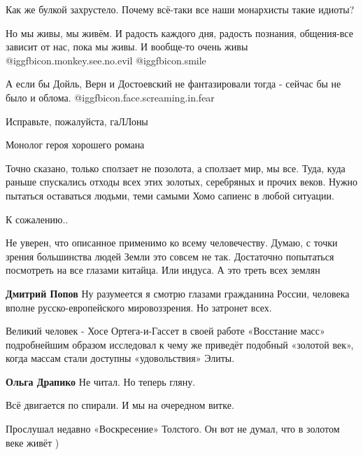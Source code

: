 \begin{itemize}
\begin{itemize}
Как же булкой захрустело. Почему всё-таки все наши монархисты такие идиоты?
\end{itemize} %


Но мы живы, мы живём. И радость каждого дня, радость познания, общения-все
зависит от нас, пока мы живы. И вообще-то очень живы
@igg{fbicon.monkey.see.no.evil}  @igg{fbicon.smile} 


А если бы Дойль, Верн и Достоевский не фантазировали тогда - сейчас бы не было
и облома.  @igg{fbicon.face.screaming.in.fear} 

Исправьте, пожалуйста, гаЛЛоны

Монолог героя хорошего романа


Точно сказано, только сползает не позолота, а сползает мир, мы все. Туда, куда
раньше спускались отходы всех этих золотых, серебряных и прочих веков. Нужно
пытаться оставаться людьми, теми самыми Хомо сапиенс в любой ситуации.

К сожалению..


Не уверен, что описанное применимо ко всему человечеству. Думаю, с точки зрения
большинства людей Земли это совсем не так. Достаточно попытаться посмотреть на
все глазами китайца. Или индуса. А это треть всех землян

\begin{itemize} %
\textbf{Дмитрий Попов} Ну разумеется я смотрю глазами гражданина России, человека вполне русско-европейского мировоззрения. Но затронет всех.
\end{itemize} %


Великий человек - Хосе Ортега-и-Гассет в своей работе «Восстание масс»
подробнейшим образом исследовал к чему же приведёт подобный «золотой век»,
когда массам стали доступны «удовольствия» Элиты.

\begin{itemize} %
\textbf{Ольга Драпико} Не читал. Но теперь гляну.
\end{itemize} %

Всё двигается по спирали. И мы на очередном витке.

Прослушал недавно «Воскресение» Толстого. Он вот не думал, что в золотом веке живёт )


\end{itemize}
